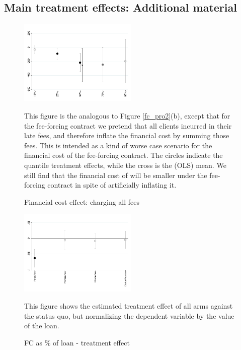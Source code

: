 \documentclass[11pt]{article}
\begin{document}
\newpage
\subsection{Main treatment effects: Additional material}

\vspace{.2in}
\begin{figure}[H]
        \caption{Financial cost effect: charging all fees}
    \label{fc_allfee}
    \begin{center}
        \centering
        \includegraphics[width=0.50\textwidth]{Figuras/fc_allfee_quantile_pro_2.pdf}
    \end{center}
    \scriptsize
     This figure is the analogous to Figure \ref{fc_pro2}(b), except that for the fee-forcing contract we pretend that all clients incurred in their late fees, and therefore inflate the financial cost by summing those fees. This is intended as a kind of worse case scenario for the financial cost of the fee-forcing contract. The circles indicate the quantile treatment effects, while the cross is the (OLS) mean. We still find that the financial cost of will be smaller under the fee-forcing contract in spite of artificially inflating it.
\end{figure}





\begin{figure}[H]
        \caption{FC as \% of loan - treatment effect}
    \label{fc_perc}
    \begin{center}
        \centering
        \includegraphics[width=0.50\textwidth]{Figuras/fc_perc_te_allarms.pdf}
    \end{center}
     \scriptsize This figure shows the estimated treatment effect of all arms against the status quo, but normalizing the dependent variable by the value of the loan.
\end{figure}
\end{document}
